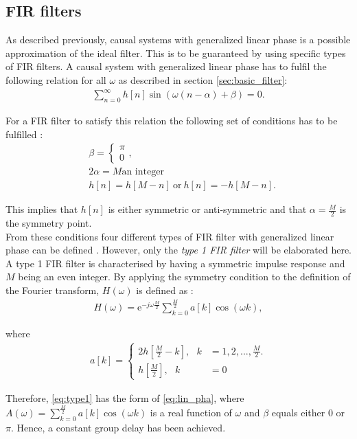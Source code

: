 \subsection{FIR filters}
As described previously, causal systems with generalized linear phase is a possible approximation of the ideal filter. This is to be guaranteed by using specific types of FIR filters. A causal system with generalized linear phase has to fulfil the following relation for all $\omega$ as described in section \ref{sec:basic_filter}:
\begin{align*}
\sum_{n=0}^{\infty}h[n]\sin\left(\omega \left(n-\alpha \right) + \beta \right) = 0.
\end{align*}

For a FIR filter to satisfy this relation the following set of conditions has to be fulfilled \cite{page 341, DTSP}:
\begin{align} \label{eq:FIR_con}
&\beta = \left\{ \begin{matrix}
\pi  \\
0 
\end{matrix}\right., \nonumber  \\ 
&2\alpha = M \text{an integer} \\ 
&h[n]=h[M-n] \ \text{or} \ h[n]=-h[M-n]. \nonumber  
\end{align}

This implies that $h[n]$ is either symmetric or anti-symmetric and that $\alpha = \frac{M}{2}$ is the symmetry point. \\
From these conditions four different types of FIR filter with generalized linear phase can be defined \cite{page 343-344, DTSP}. However, only the \textit{type 1 FIR filter} will be elaborated here.
A type 1 FIR filter is characterised by having a symmetric impulse response and $M$ being an even integer. By applying the symmetry condition to the definition of the Fourier transform, $H(\omega)$ is defined as \cite{page 343, DTSP}:
\begin{align}\label{eq:type1}
H(\omega) = \text{e}^{-j\omega \frac{M}{2}} \sum_{k=0}^{\frac{M}{2}} a[k] \cos (\omega k),
\end{align}

where 
\begin{align*}
a[k]= \left\{ \begin{matrix}
2h\left[ \frac{M}{2} - k \right], \ \ \ k &= 1,2,... , \frac{M}{2}.   \\
h[\frac{M}{2}], \ \ \ k &= 0  
\end{matrix}\right.
\end{align*}

Therefore, \eqref{eq:type1} has the form of \eqref{eq:lin_pha}, where $A(\omega) = \sum_{k=0}^{\frac{M}{2}} a[k]\cos (\omega k)$ is a real function of $\omega$ and $\beta$ equals either 0 or $\pi$. Hence, a constant group delay has been achieved.